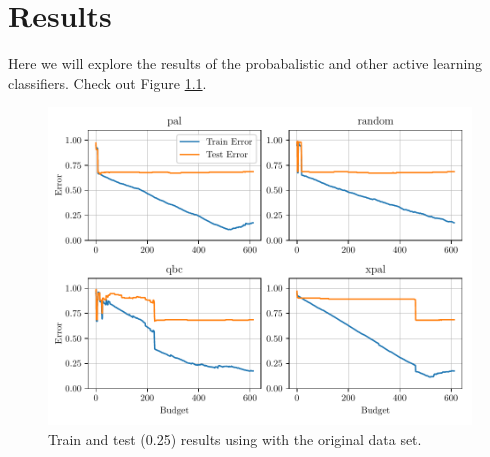 \chapter{Results}

Here we will explore the results of the probabalistic and other active learning classifiers. Check out Figure \ref{fig:plot_all_results}.

\begin{figure}[!ht]
  \centering
  \includegraphics[width=\textwidth]{../img/plot_all_results.pdf}
  \caption{Train and test (0.25) results using with the original data set.}
  \label{fig:plot_all_results}
\end{figure}

